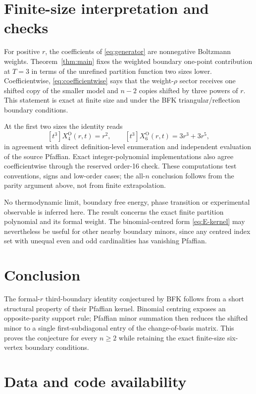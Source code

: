 \documentclass[11pt]{article}
\begin{document}
\section{Finite-size interpretation and checks}

For positive \(r\), the coefficients of \eqref{eq:generator} are
nonnegative Boltzmann weights.  Theorem~\ref{thm:main} fixes the weighted
boundary one-point contribution at \(T=3\) in terms of the unrefined
partition function two sizes lower.  Coefficientwise,
\eqref{eq:coefficientwise} says that the weight-\(\rho\) sector receives
one shifted copy of the smaller model and \(n-2\) copies shifted by three
powers of \(r\).  This statement is exact at finite size and under the BFK
triangular/reflection boundary conditions.

At the first two sizes the identity reads
\[
 [t^3]X^{\mathrm O}_{4}(r,t)=r^2,\qquad
 [t^3]X^{\mathrm O}_{6}(r,t)=3r^3+3r^5,
\]
in agreement with direct definition-level enumeration and independent
evaluation of the source Pfaffian.  Exact integer-polynomial
implementations also agree coefficientwise through the reserved order-16
check.  These computations test conventions, signs and low-order cases;
the all-\(n\) conclusion follows from the parity argument above, not from
finite extrapolation.

No thermodynamic limit, boundary free energy, phase transition or
experimental observable is inferred here.  The result concerns the exact
finite partition polynomial and its formal weight.  The binomial-centred
form \eqref{eq:E-kernel} may nevertheless be useful for other nearby
boundary minors, since any centred index set with unequal even and odd
cardinalities has vanishing Pfaffian.

\section{Conclusion}

The formal-\(r\) third-boundary identity conjectured by BFK follows from a
short structural property of their Pfaffian kernel.  Binomial centring
exposes an opposite-parity support rule; Pfaffian minor summation then
reduces the shifted minor to a single first-subdiagonal entry of the
change-of-basis matrix.  This proves the conjecture for every \(n\geq2\)
while retaining the exact finite-size six-vertex boundary conditions.

\section*{Data and code availability}
\end{document}
